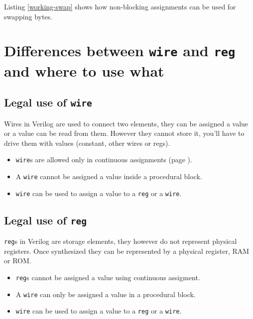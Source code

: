 \documentclass[a4paper,10pt]{article}
\theoremstyle{mytheor}
\newcommand{
  \insertverilog}[3]{
  
}
\begin{document}
Listing \ref{working-swap} shows how non-blocking assignments can be
used for swapping bytes.

\insertverilog{./verilog_files/workingSwap.v}{working-swap}{Swapping bytes using non-blocking assignment\, it works!}   

\section{Differences between \lstinline[style=verilog-inline-style]{wire} and \lstinline[style=verilog-inline-style]{reg} and where to use what}
\subsection{Legal use of \lstinline[style=verilog-inline-style]{wire}}
Wires in Verilog are used to connect two elements, they can be
assigned a value or a value can be read from them. However they cannot
store it, you'll have to drive them with values (constant, other wires
or regs).

\begin{itemize}
\item \lstinline[style=verilog-inline-style]{wire}s are allowed only
  in continuous assignments (page \pageref{continuous-assignment}).
\item A \lstinline[style=verilog-inline-style]{wire} cannot be
  assigned a value inside a procedural block.
\item \lstinline[style=verilog-inline-style]{wire} can be used to
  assign a value to a \lstinline[style=verilog-inline-style]{reg} or a
  \lstinline[style=verilog-inline-style]{wire}.
\end{itemize}

\subsection{Legal use of \lstinline[style=verilog-inline-style]{reg}}
\lstinline[style=verilog-inline-style]{reg}s in Verilog are storage
elements, they however do not represent physical registers. Once
synthesized they can be represented by a physical register, RAM or
ROM.

 \begin{itemize}
 \item \lstinline[style=verilog-inline-style]{reg}s cannot be assigned
   a value using continuous assigment.
 \item A \lstinline[style=verilog-inline-style]{wire} can only be
   assigned a value in a procedural block.
 \item \lstinline[style=verilog-inline-style]{wire} can be used to
   assign a value to a \lstinline[style=verilog-inline-style]{reg} or
   a \lstinline[style=verilog-inline-style]{wire}.
\end{itemize}
\end{document}
